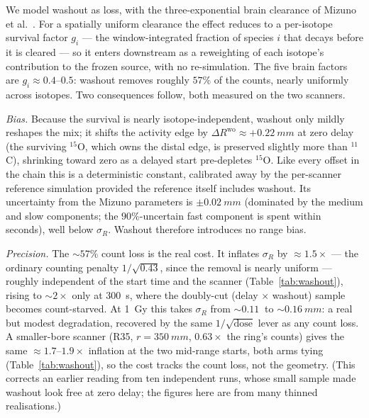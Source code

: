 \documentclass[11pt]{article}
\newcommand{\DR}{\Delta R}
\begin{document}
We model washout as loss, with the three-exponential brain clearance of
Mizuno et al.~\cite{Mizuno2003}. For a spatially uniform clearance the effect
reduces to a per-isotope survival factor $g_i$ --- the window-integrated
fraction of species $i$ that decays before it is cleared --- so it enters
downstream as a reweighting of each isotope's contribution to the frozen
source, with no re-simulation. The five brain factors are $g_i \approx
0.4$--$0.5$: washout removes roughly $57\%$ of the counts, nearly uniformly
across isotopes. Two consequences follow, both measured on the two scanners.

\emph{Bias.} Because the survival is nearly isotope-independent, washout only
mildly reshapes the mix; it shifts the activity edge by
$\DR^{\mathrm{wo}} \approx +\SI{0.22}{mm}$ at zero delay (the surviving
$^{15}$O, which owns the distal edge, is preserved slightly more than
$^{11}$C), shrinking toward zero as a delayed start pre-depletes $^{15}$O. Like
every offset in the chain this is a deterministic constant, calibrated away by
the per-scanner reference simulation provided the reference itself includes
washout. Its uncertainty from the Mizuno parameters is $\pm\SI{0.02}{mm}$
(dominated by the medium and slow components; the $90\%$-uncertain fast
component is spent within seconds), well below $\sigma_R$. Washout therefore
introduces no range bias.

\emph{Precision.} The $\sim\!57\%$ count loss is the real cost. It inflates
$\sigma_R$ by $\approx 1.5\times$ --- the ordinary counting penalty
$1/\sqrt{0.43}$, since the removal is nearly uniform --- roughly independent of
the start time and the scanner (Table~\ref{tab:washout}), rising to
$\sim\!2\times$ only at \SI{300}{s}, where the doubly-cut (delay $\times$
washout) sample becomes count-starved. At \SI{1}{Gy} this takes $\sigma_R$ from
$\sim\!\SI{0.11}{}$ to $\sim\!\SI{0.16}{mm}$: a real but modest degradation,
recovered by the same $1/\sqrt{\text{dose}}$ lever as any count loss. A
smaller-bore scanner (R35, $r=\SI{350}{mm}$, $0.63\times$ the ring's counts)
gives the same $\approx\!1.7$--$1.9\times$ inflation at the two mid-range
starts, both arms tying (Table~\ref{tab:washout}), so the cost tracks the count
loss, not the geometry. (This corrects an earlier reading from ten independent
runs, whose small sample made washout look free at zero delay; the figures here
are from many thinned realisations.)
\end{document}
